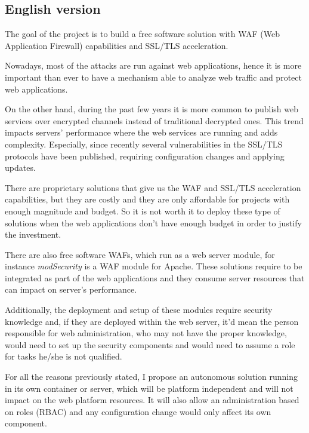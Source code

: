 \subsection{English version}
\par The goal of the project is to build a free software solution with WAF (Web Application Firewall) capabilities and SSL/TLS acceleration.
\par Nowadays, most of the attacks are run against web applications, hence it is more important than ever to have a
mechanism able to analyze web traffic and protect web applications.
\par On the other hand, during the past few years it is more common to publish web services over encrypted channels
instead of traditional decrypted ones. This trend impacts servers' performance where the web services are running
and adds complexity. Especially, since recently several vul\-ne\-ra\-bi\-li\-ties in the SSL/TLS protocols have been published,
requiring configuration changes and applying updates.
\par There are proprietary solutions that give us the WAF and SSL/TLS acceleration capabilities, but they are costly
and they are only affordable for projects with enough magnitude and budget. So it is not worth it to deploy these type
of solutions when the web applications don't have enough budget in order to justify the investment.
\par There are also free software WAFs, which run as a web server module, for instance {\em modSecurity} is a WAF
module for Apache. These solutions require to be integrated as part of the web applications and they consume server
resources that can impact on server's performance.
\par Additionally, the deployment and setup of these modules require security knowledge and, if they are deployed
within the web server, it'd mean the person responsible for web administration, who may not have the proper knowledge,
would need to set up the security components and would need to assume a role for tasks he/she is not qualified.
\par For all the reasons previously stated, I propose an autonomous solution running in its own con\-tai\-ner or server,
which will be platform independent and will not impact on the web platform resources. It will also allow an
administration based on roles (RBAC) and any configuration change would only affect its own component.

\begin{comment}
\end{comment}

